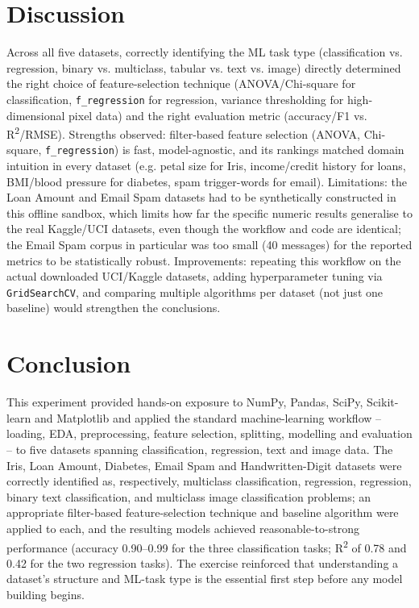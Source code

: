 \documentclass[12pt,a4paper]{article}
\begin{document}
\section{Discussion}
Across all five datasets, correctly identifying the ML task type (classification vs.
regression, binary vs. multiclass, tabular vs. text vs. image) directly determined the right
choice of feature-selection technique (ANOVA/Chi-square for classification, \texttt{f\_regression}
for regression, variance thresholding for high-dimensional pixel data) and the right evaluation
metric (accuracy/F1 vs. R\textsuperscript{2}/RMSE). Strengths observed: filter-based feature
selection (ANOVA, Chi-square, \texttt{f\_regression}) is fast, model-agnostic, and its rankings
matched domain intuition in every dataset (e.g. petal size for Iris, income/credit history for
loans, BMI/blood pressure for diabetes, spam trigger-words for email). Limitations: the Loan
Amount and Email Spam datasets had to be synthetically constructed in this offline sandbox,
which limits how far the specific numeric results generalise to the real Kaggle/UCI datasets,
even though the workflow and code are identical; the Email Spam corpus in particular was too
small (40 messages) for the reported metrics to be statistically robust. Improvements: repeating
this workflow on the actual downloaded UCI/Kaggle datasets, adding hyperparameter tuning via
\texttt{GridSearchCV}, and comparing multiple algorithms per dataset (not just one baseline)
would strengthen the conclusions.

\section{Conclusion}
This experiment provided hands-on exposure to NumPy, Pandas, SciPy, Scikit-learn and Matplotlib
and applied the standard machine-learning workflow -- loading, EDA, preprocessing, feature
selection, splitting, modelling and evaluation -- to five datasets spanning classification,
regression, text and image data. The Iris, Loan Amount, Diabetes, Email Spam and
Handwritten-Digit datasets were correctly identified as, respectively, multiclass
classification, regression, regression, binary text classification, and multiclass image
classification problems; an appropriate filter-based feature-selection technique and baseline
algorithm were applied to each, and the resulting models achieved reasonable-to-strong
performance (accuracy 0.90--0.99 for the three classification tasks; R\textsuperscript{2} of
0.78 and 0.42 for the two regression tasks). The exercise reinforced that understanding a
dataset's structure and ML-task type is the essential first step before any model building
begins.
\end{document}

